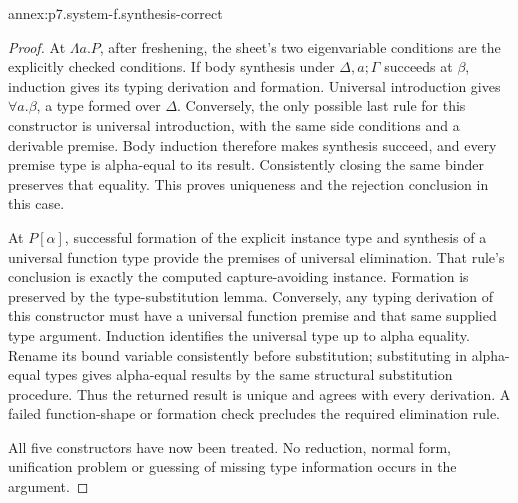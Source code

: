 \begin{annexitem}{annex:p7.system-f.synthesis-correct}
\begin{proof}
At \(\Lambda a.P\), after freshening, the sheet's two eigenvariable
conditions are the explicitly checked conditions. If body synthesis
under \(\Delta,a;\Gamma\) succeeds at \(\beta\), induction gives
its typing derivation and formation. Universal introduction gives
\(\forall a.\beta\), a type formed over \(\Delta\). Conversely,
the only possible last rule for this constructor is universal introduction,
with the same side conditions and a derivable premise. Body induction
therefore makes synthesis succeed, and every premise type is alpha-equal
to its result. Consistently closing the same binder preserves that equality.
This proves uniqueness and the rejection conclusion in this case.

At \(P[\alpha]\), successful formation of the explicit instance type
and synthesis of a universal function type provide the premises of
universal elimination. That rule's conclusion is exactly the computed
capture-avoiding instance. Formation is preserved by the type-substitution
lemma. Conversely, any typing derivation of this constructor must have
a universal function premise and that same supplied type argument.
Induction identifies the universal type up to alpha equality. Rename
its bound variable consistently before substitution; substituting in
alpha-equal types gives alpha-equal results by the same structural
substitution procedure. Thus the returned result is unique and agrees
with every derivation. A failed function-shape or formation check
precludes the required elimination rule.

All five constructors have now been treated. No reduction, normal form,
unification problem or guessing of missing type information occurs in
the argument.
\end{proof}
\end{annexitem}

